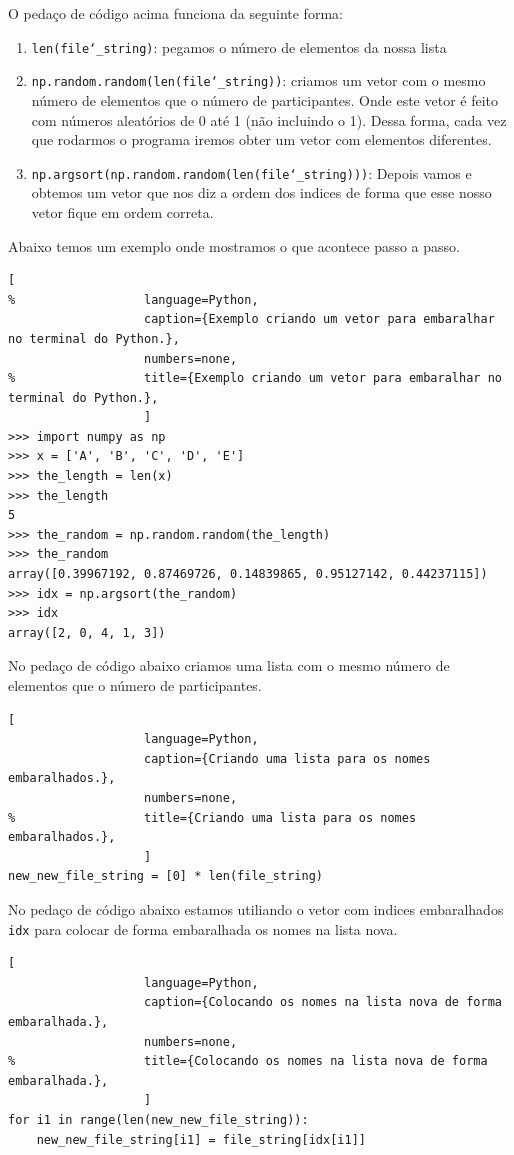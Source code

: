 O pedaço de código acima funciona da seguinte forma:
\begin{enumerate}[label = \arabic*.]

\item \texttt{len(file\char`_string)}: pegamos o número de elementos da nossa lista

\item \texttt{np.random.random(len(file\char`_string))}: criamos um vetor com o mesmo número de elementos que o número de participantes. Onde este vetor é feito com números aleatórios de 0 até 1 (não incluindo o 1). Dessa forma, cada vez que rodarmos o programa iremos obter um vetor com elementos diferentes.

\item \texttt{np.argsort(np.random.random(len(file\char`_string)))}: Depois vamos e obtemos um vetor que nos diz a ordem dos indices de forma que esse nosso vetor fique em ordem correta.

\end{enumerate}
Abaixo temos um exemplo onde mostramos o que acontece passo a passo.

\begin{lstlisting}[
%				   language=Python,
				   caption={Exemplo criando um vetor para embaralhar no terminal do Python.},
				   numbers=none,
%				   title={Exemplo criando um vetor para embaralhar no terminal do Python.},
				   ]
>>> import numpy as np
>>> x = ['A', 'B', 'C', 'D', 'E']
>>> the_length = len(x)
>>> the_length
5
>>> the_random = np.random.random(the_length)
>>> the_random
array([0.39967192, 0.87469726, 0.14839865, 0.95127142, 0.44237115])
>>> idx = np.argsort(the_random)
>>> idx
array([2, 0, 4, 1, 3])
\end{lstlisting}

No pedaço de código abaixo criamos uma lista com o mesmo número de elementos que o número de participantes.

\begin{lstlisting}[
				   language=Python,
				   caption={Criando uma lista para os nomes embaralhados.},
				   numbers=none,
%				   title={Criando uma lista para os nomes embaralhados.},
				   ]
new_new_file_string = [0] * len(file_string)
\end{lstlisting}

No pedaço de código abaixo estamos utiliando o vetor com indices embaralhados \texttt{idx} para colocar de forma embaralhada os nomes na lista nova.

\begin{lstlisting}[
				   language=Python,
				   caption={Colocando os nomes na lista nova de forma embaralhada.},
				   numbers=none,
%				   title={Colocando os nomes na lista nova de forma embaralhada.},
				   ]
for i1 in range(len(new_new_file_string)):
    new_new_file_string[i1] = file_string[idx[i1]]
\end{lstlisting}

